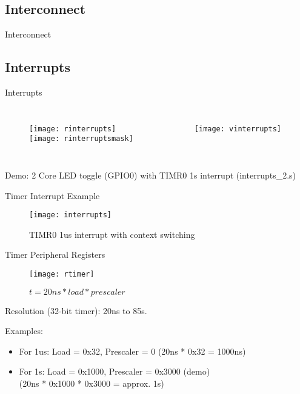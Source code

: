 \documentclass[aspectratio=169]{beamer}
\begin{document}
\subsection{Interconnect}
\begin{frame}{Interconnect}

\end{frame}

\subsection{Interrupts}
\begin{frame}[t]{Interrupts}
\begin{columns}[t]
\begin{figure}
\texttt{[image: rinterrupts]}\\
\vspace{.5cm}
\texttt{[image: rinterruptsmask]}
\end{figure}
\begin{figure}
\texttt{[image: vinterrupts]}
\end{figure}
\end{columns}
\vspace{1cm}
Demo: 2 Core LED toggle (GPIO0) with TIMR0 1s interrupt (interrupts\_2.s)
\end{frame}

\begin{frame}{Timer Interrupt Example}
    \begin{figure}
        \centering
        \texttt{[image: interrupts]}
        \caption{TIMR0 1us interrupt with context switching}
        \label{fig:my_label}
    \end{figure}
\end{frame}

\begin{frame}{Timer Peripheral Registers}
    \begin{figure}
        \centering
        \texttt{[image: rtimer]}
        \caption{$t = 20{ns} * {load} * {prescaler}$}
        \label{}
    \end{figure}
    Resolution (32-bit timer): 20ns to 85s.
    
    Examples: 
    \begin{itemize}
        \item For 1us: Load = 0x32, Prescaler = 0 (20ns * 0x32 = 1000ns)
        \item For 1s:  Load = 0x1000, Prescaler = 0x3000 (demo)\\(20ns * 0x1000 * 0x3000 = approx. 1s)
    \end{itemize}
\end{frame}
\end{document}

